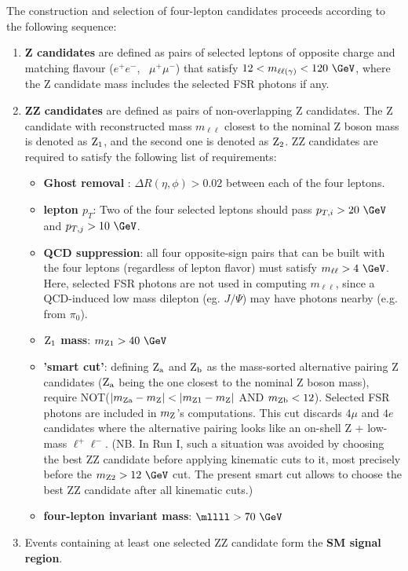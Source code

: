 The construction and selection of four-lepton candidates proceeds 
according to the following sequence:
\begin{enumerate}
\item {\bf Z candidates} are defined as pairs of selected leptons
 of opposite charge and matching flavour ($e^+ e^-$, \, $\mu^+\mu^-$)
 that satisfy $12 < m_{\ell\ell(\gamma)} < 120~\GeV$, where the Z candidate mass
 includes the selected FSR photons if any.
\item {\bf ZZ candidates} are defined as pairs of non-overlapping Z candidates.
 The Z candidate with reconstructed mass $m_{\ell\ell}$ closest to the nominal Z boson
 mass is denoted as ${\rm Z_1}$, and the second one is denoted as ${\rm Z_2}$.
 ZZ candidates are required to satisfy the following list of requirements:
  \begin{itemize} 
  \item {\bf Ghost removal }: $\Delta R(\eta,\phi) > 0.02$ between each of the four leptons.
  \item {\bf lepton $p_T$}: Two of the four selected leptons should pass 
     $p_{T,i} > 20~\GeV$ and $p_{T,j} > 10~\GeV$.
  \item {\bf QCD suppression}: all four opposite-sign pairs that can
     be built with the four leptons (regardless of lepton flavor)
     must satisfy $m_{\ell\ell} > 4~\GeV$.
     Here, selected FSR photons are not used in computing $m_{\ell\ell}$, 
     since a QCD-induced low mass dilepton (eg. $J/\Psi$) 
     may have photons nearby (e.g. from $\pi_0$). 
  \item {\bf ${\rm Z_1}$ mass}: $m_{\rm Z1} > 40~\GeV$
  \item {\bf 'smart cut'}: defining ${\rm Z_a}$ and ${\rm Z_b}$ as 
     the mass-sorted alternative pairing Z candidates 
     (${\rm Z_a}$ being the one closest to the nominal Z boson mass),
     require NOT($|m_{\rm Za}-m_{\rm Z}| < |m_{\rm Z1}-m_{\rm Z}|$ AND $m_{\rm Zb}<12$).
     Selected FSR photons are included in $m_{\rm Z}$'s computations.
     This cut discards $4\mu$ and $4e$ candidates where the alternative pairing
     looks like an on-shell Z + low-mass $\ell^+ \ell^-$. 
     (NB. In Run I, such a situation was avoided by choosing the best ZZ candidate
     before applying kinematic cuts to it, most precisely before the $m_{\rm Z2} > 12~\GeV$ cut.
     The present smart cut allows to choose the best ZZ candidate after all kinematic cuts.)   
  \item {\bf four-lepton invariant mass}: $\mllll > 70~\GeV$
  \end{itemize}	
\item Events containing at least one selected ZZ candidate form the {\bf SM signal region}.
\end{enumerate}	


